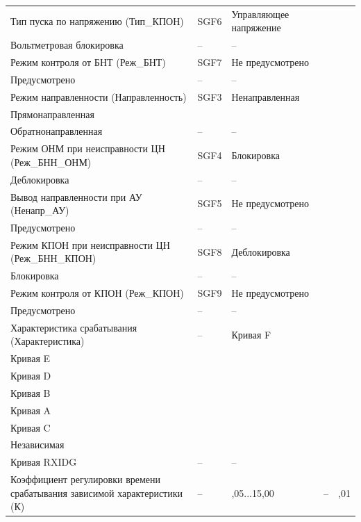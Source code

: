 \begin{longtable}{|>{\centering\arraybackslash}m{5.3cm}|>{\centering\arraybackslash}m{3.3cm}|>{\centering\arraybackslash}m{4.2cm}|>{\centering\arraybackslash}m{1.8cm}|>{\centering\arraybackslash}m{1cm}|}
\hline
\centering Тип пуска по напряжению (Тип\_КПОН)  & \centering SGF6 & \centering Управляющее напряжение \\ Вольтметровая блокировка & \centering -- & \centering \arraybackslash -- \\
\hline
\centering Режим контроля от БНТ (Реж\_БНТ)  & \centering SGF7 & \centering Не предусмотрено \\ Предусмотрено & \centering -- & \centering \arraybackslash -- \\
\hline
\centering Режим направленности (Направленность)  & \centering SGF3 & \centering Ненаправленная \\ Прямонаправленная \\ Обратнонаправленная & \centering -- & \centering \arraybackslash -- \\
\hline
\centering Режим ОНМ при неисправности ЦН (Реж\_БНН\_ОНМ)  & \centering SGF4 & \centering Блокировка \\ Деблокировка & \centering -- & \centering \arraybackslash -- \\
\hline
\centering Вывод направленности при АУ (Ненапр\_АУ)  & \centering SGF5 & \centering Не предусмотрено \\ Предусмотрено & \centering -- & \centering \arraybackslash -- \\
\hline
\centering Режим КПОН при неисправности ЦН (Реж\_БНН\_КПОН)  & \centering SGF8 & \centering Деблокировка \\ Блокировка & \centering -- & \centering \arraybackslash -- \\
\hline
\centering Режим контроля от КПОН (Реж\_КПОН)  & \centering SGF9 & \centering Не предусмотрено \\ Предусмотрено & \centering -- & \centering \arraybackslash -- \\
\hline
\centering Характеристика срабатывания (Характеристика)  & \centering -- & \centering Кривая F \\ Кривая E \\ Кривая D \\ Кривая B \\ Кривая A \\ Кривая C \\ Независимая \\ Кривая RXIDG & \centering -- & \centering \arraybackslash -- \\
\hline
\centering Коэффициент регулировки времени срабатывания зависимой характеристики (К)  & \centering -- & \centering 0,05...15,00 & \centering -- & \centering \arraybackslash 0,01 \\

\end{longtable}
